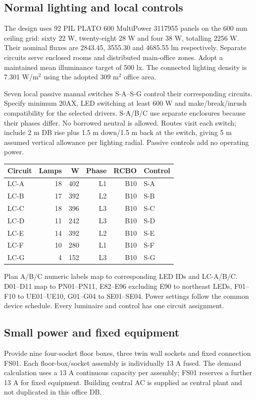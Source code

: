 {\fontsize{12}{14}\selectfont\tenantselection}
\subsection*{Normal lighting and local controls}
The design uses 92 PIL PLATO 600 MultiPower 3117955 panels on the 600 mm ceiling grid: sixty 22 W, twenty-eight 28 W and four 38 W, totalling 2256 W. Their nominal fluxes are 2843.45, 3555.30 and 4685.55 lm respectively. Separate circuits serve enclosed rooms and distributed main-office zones. Adopt a maintained mean illuminance target of 500 lx. The connected lighting density is 7.301 W/m$^2$ using the adopted 309 m$^2$ office area.

Seven local passive manual switches S-A--S-G control their corresponding circuits. Specify minimum 20AX, LED switching at least 600 W and make/break/inrush compatibility for the selected drivers. S-A/B/C use separate enclosures because their phases differ. No borrowed neutral is allowed. Routes visit each switch;  include 2 m DB rise plus 1.5 m down/1.5 m back at the switch, giving 5 m assumed vertical allowance per lighting radial. Passive controls add no operating power.
\begin{center}\begin{tabular}{lrrrrl}\toprule
Circuit & Lamps & W & Phase & RCBO & Control\\\midrule

LC-A & 18 & 402 & L1 & B10 & S-A \\
LC-B & 17 & 392 & L2 & B10 & S-B \\
LC-C & 18 & 396 & L3 & B10 & S-C \\
LC-D & 11 & 242 & L3 & B10 & S-D \\
LC-E & 14 & 392 & L2 & B10 & S-E \\
LC-F & 10 & 280 & L1 & B10 & S-F \\
LC-G & 4 & 152 & L3 & B10 & S-G \\

\bottomrule\end{tabular}\end{center}
Plan A/B/C numeric labels map to corresponding LED IDs and LC-A/B/C. D01--D11 map to PN01--PN11, E82--E96 excluding E90 to northeast LEDs, F01--F10 to UE01--UE10, G01--G04 to SE01--SE04. Power settings follow the common device schedule. Every luminaire and control has one circuit assignment.

\subsection*{Small power and fixed equipment}
Provide nine four-socket floor boxes, three twin wall sockets and fixed connection FS01. Each floor-box/socket assembly is individually 13 A fused. The demand calculation uses a 13 A continuous capacity per assembly; FS01 reserves a further 13 A for fixed equipment. Building central AC is supplied as central plant and not duplicated in this office DB.

